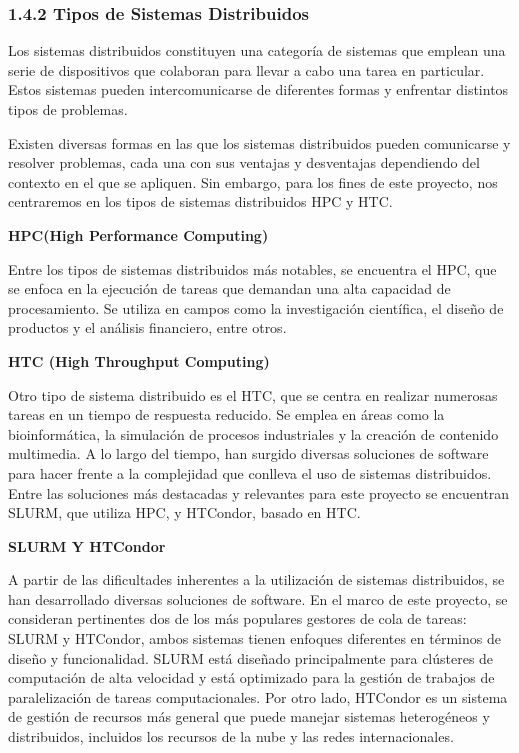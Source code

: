 \begin{spacing}{1.5}
  \subsubsection{1.4.2 Tipos de Sistemas Distribuidos}

  Los sistemas distribuidos constituyen una categoría de sistemas que emplean
  una serie de dispositivos que colaboran para llevar a cabo una tarea en
  particular. Estos sistemas pueden intercomunicarse de diferentes formas y
  enfrentar distintos tipos de problemas.

  Existen diversas formas en las que los sistemas distribuidos pueden
  comunicarse y resolver problemas, cada una con sus ventajas y desventajas
  dependiendo del contexto en el que se apliquen. Sin embargo, para los fines de
  este proyecto, nos centraremos en los tipos de sistemas distribuidos HPC y HTC.
  \vspace{3mm}

  \textbf{HPC(High Performance Computing)}

  Entre los tipos de sistemas distribuidos más notables, se encuentra el HPC,
  que se enfoca en la ejecución de tareas que demandan una alta capacidad de
  procesamiento. Se utiliza en campos como la investigación científica, el diseño
  de productos y el análisis financiero, entre otros.

  \textbf{HTC (High Throughput Computing)}

  Otro tipo de sistema distribuido es el HTC, que se centra en realizar
  numerosas tareas en un tiempo de respuesta reducido. Se emplea en áreas como la
  bioinformática, la simulación de procesos industriales y la creación de
  contenido multimedia.
  A lo largo del tiempo, han surgido diversas soluciones de software para hacer
  frente a la complejidad que conlleva el uso de sistemas distribuidos. Entre las
  soluciones más destacadas y relevantes para este proyecto se encuentran SLURM,
  que utiliza HPC, y HTCondor, basado en HTC.  \vspace{3mm}

  \textbf{SLURM Y HTCondor}

  A partir de las dificultades inherentes a la utilización de sistemas
  distribuidos, se han desarrollado diversas soluciones de software. En el marco
  de este proyecto, se consideran pertinentes dos de los más populares gestores
  de cola de tareas: SLURM y HTCondor, ambos sistemas tienen enfoques diferentes
  en términos de diseño y funcionalidad. SLURM está diseñado principalmente para
  clústeres de computación de alta velocidad y está optimizado para la gestión de
  trabajos de paralelización de tareas computacionales. Por otro lado, HTCondor
  es un sistema de gestión de recursos más general que puede manejar sistemas
  heterogéneos y distribuidos, incluidos los recursos de la nube y las redes
  internacionales.


\end{spacing}
